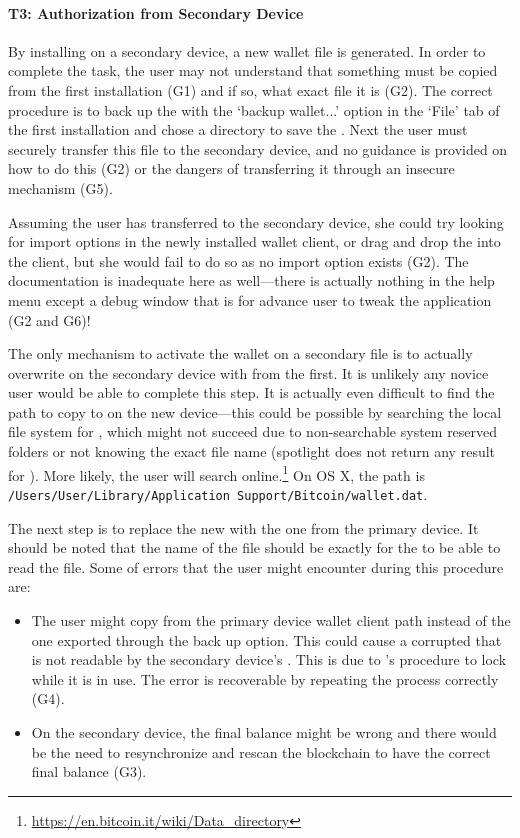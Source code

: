 \paragraph{T3: Authorization from Secondary Device} 

By installing \bitcoinclient on a secondary device, a new wallet file is generated. In order to complete the task, the user may not understand that something must be copied from the first installation (G1) and if so, what exact file it is (G2). The correct procedure is to back up the \walletfile with the `backup wallet...' option in the `File' tab of the first installation and chose a directory to save the \walletfile. Next the user must securely transfer this file to the secondary device, and no guidance is provided on how to do this (G2) or the dangers of transferring it through an insecure mechanism (G5).

Assuming the user has transferred \walletfile to the secondary device, she could try looking for import options in the newly installed wallet client, or drag and drop the \walletfile into the client, but she would fail to do so as no import option exists (G2). The documentation is inadequate here as well---there is actually nothing in the help menu except a debug window that is for advance user to tweak the application (G2 and G6)!

The only mechanism to activate the wallet on a secondary file is to actually overwrite \walletfile on the secondary device with \walletfile from the first. It is unlikely any novice user would be able to complete this step. It is actually even difficult to find the path to copy \walletfile to on the new device---this could be possible by searching the local file system for \walletfile, which might not succeed due to non-searchable system reserved folders or not knowing the exact file name (spotlight does not return any result for \walletfile). More likely, the user will search online.\footnote{\url{https://en.bitcoin.it/wiki/Data_directory}} On OS X, the path is \texttt{/Users/User/Library/Application Support/Bitcoin/wallet.dat}.

The next step is to replace the new \walletfile with the one from the primary device. It should be noted that the name of the file should be exactly \walletfile for the \bitcoinclient to be able to read the file. Some of errors that the user might encounter during this procedure are:
\begin{itemize}
	\item The user might copy \walletfile from the primary device wallet client path instead of the one exported through the back up option. This could cause a corrupted \walletfile that is not readable by the secondary device's \bitcoinclient. This is due to \bitcoinclient's procedure to lock \walletfile while it is in use. The error is recoverable by repeating the process correctly (G4). 
	\item On the secondary device, the final balance might be wrong and there would be the need to resynchronize and rescan the blockchain to have the correct final balance (G3).
\end{itemize}

